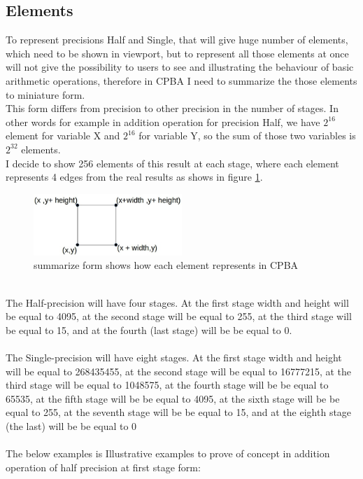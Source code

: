 \documentclass[11pt]{article}
\begin{document}
\subsection{Elements}
To represent precisions Half and Single, that will give huge number of elements, which need to be shown in viewport, but to represent all those elements at once will not give the possibility to users to see and illustrating the behaviour of basic arithmetic operations, therefore in CPBA I need to summarize the those elements to miniature form.\\
This form differs from precision to other precision in the number of stages. In other words for example in addition operation for precision Half, we have $2^{16}$ element for variable X and $2^{16}$ for variable Y, so the sum of those two variables is $2^{32}$ elements.\\
I decide to show 256 elements of this result at each stage, where each element represents 4 edges from the real results as shows in figure \ref{edges}.\\
\begin{figure}[h]
    \centering
    \includegraphics[width=0.5\textwidth]{edges}
    \caption{summarize form shows how each element represents in CPBA}
    \label{edges}
\end{figure}\\
The Half-precision will have four stages. At the first stage width and height will be equal to 4095, at the second stage will be equal to 255, at the third stage will be equal to 15,  and at the fourth (last stage) will be be equal to 0.\\\\
The Single-precision will have eight stages. At the first stage width and height will be equal to 268435455, at the second stage will be equal to 16777215, at the third stage will be equal to 1048575, at the fourth stage will be be equal to 65535, at the fifth stage will be be equal to 4095, at the sixth stage will be be equal to 255, at the seventh stage will be be equal to 15, and at the eighth stage (the last) will be be equal to 0\\\\
The below examples is Illustrative examples to prove of concept in addition operation of half precision at first stage form:\\\\
\end{document}

